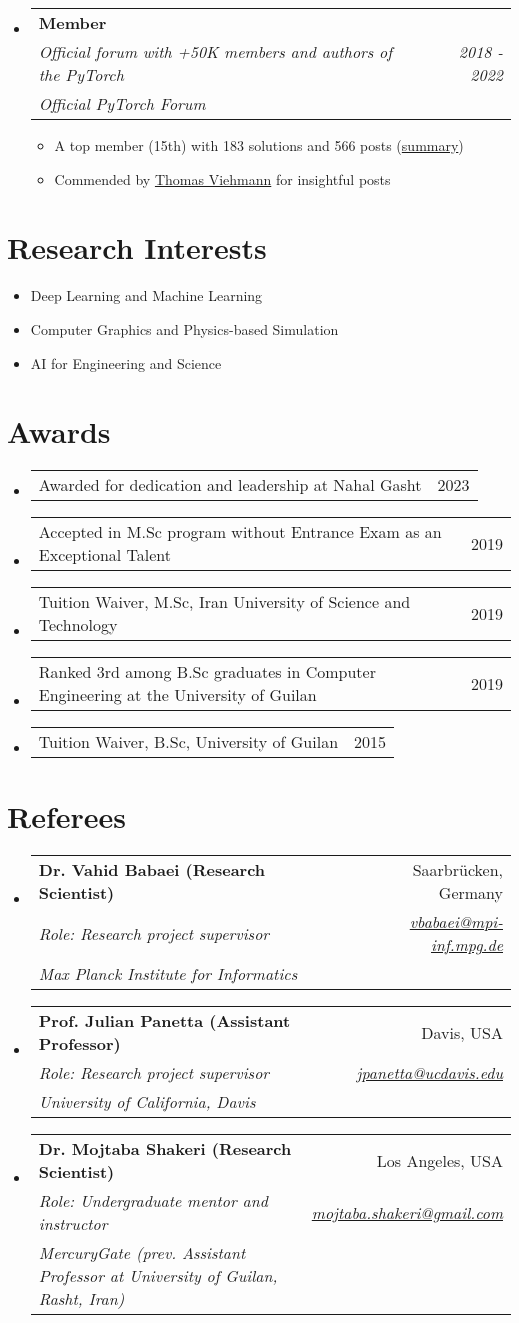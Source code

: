 \documentclass[letterpaper,11pt]{article}
\makeatletter
\newcommand{\resumeItem}[1]{
  \item\small{
    {#1 \vspace{-2pt}}
  }
}
\newcommand{\resumeSubheading}[5]{
  \item
    \begin{tabular*}{0.97\textwidth}{l@{\extracolsep{\fill}}r}
      \textbf{#1} & #2 \\ 
      \textit{\small#3} & \textit{\small #4} \\
      \textit{#5} & 
    \end{tabular*}\vspace{-5pt}
}
\newcommand{\awarditem}[2]{
  \item
    \begin{tabular*}{0.97\textwidth}{l@{\extracolsep{\fill}}r}
      #1 & #2 \\ 
    \end{tabular*}\vspace{-5pt}
}
\newcommand{\resumeSubHeadingListStart}{\begin{itemize}[leftmargin=*]}
\newcommand{\resumeSubHeadingListEnd}{\end{itemize}}
\newcommand{\resumeItemListStart}{\begin{itemize}}
\newcommand{\resumeItemListEnd}{\end{itemize}\vspace{-5pt}}
\newcommand{\awarditemListStart}{\begin{itemize}[leftmargin=*]}
\newcommand{\awarditemListEnd}{\end{itemize}\vspace{-5pt}}
\makeatother
\begin{document}
  \resumeSubHeadingListStart
    \resumeSubheading
      {Member}{}
      {Official forum with +50K members and authors of the PyTorch} 
      {2018 - 2022}{{Official PyTorch Forum}}
      \resumeItemListStart
        \resumeItem{A top member (15th) with 183 solutions and 566 posts (\href{https://discuss.pytorch.org/u/Nikronic/}{summary})}
        \resumeItem{Commended by \href{https://twitter.com/ThomasViehmann/status/1309794697049714689}{Thomas Viehmann} for insightful posts}
      \resumeItemListEnd
  \resumeSubHeadingListEnd

\section{Research Interests}
  \resumeSubHeadingListStart
    \resumeItem{Deep Learning and Machine Learning}
    \vspace{-5pt}
    \resumeItem{Computer Graphics and Physics-based Simulation} 
    \vspace{-5pt}
    \resumeItem{AI for Engineering and Science}
  \resumeSubHeadingListEnd

\section{Awards}
\awarditemListStart
  \awarditem{Awarded for dedication and leadership at Nahal Gasht}{2023}
  \awarditem{Accepted in M.Sc program without Entrance Exam as an Exceptional Talent}{2019}
  \awarditem{Tuition Waiver, M.Sc, Iran University of Science and Technology}{2019}
  \awarditem{Ranked 3rd among B.Sc graduates in Computer Engineering at the University of Guilan}{2019}
  \awarditem{Tuition Waiver, B.Sc, University of Guilan}{2015}
\awarditemListEnd

\section{Referees}
  \resumeSubHeadingListStart
    \resumeSubheading
      {Dr. Vahid Babaei (Research Scientist)}{Saarbr{\"u}cken, Germany}
       {Role: Research project supervisor}
      {\href{mailto:vbabaei@mpi-inf.mpg.de}{vbabaei@mpi-inf.mpg.de}}{Max Planck Institute for Informatics}

    \resumeSubheading
      {Prof. Julian Panetta (Assistant Professor)}{Davis, USA}
       {Role: Research project supervisor}
      {\href{mailto:jpanetta@ucdavis.edu}{jpanetta@ucdavis.edu}}{University of California, Davis}
    
    \resumeSubheading
      {Dr. Mojtaba Shakeri (Research Scientist)}{Los Angeles, USA}
       {Role: Undergraduate mentor and instructor}
      {\href{mailto:mojtaba.shakeri@gmail.com}{mojtaba.shakeri@gmail.com}}{MercuryGate (prev. Assistant Professor at University of Guilan, Rasht, Iran)}
  \resumeSubHeadingListEnd
\end{document}
